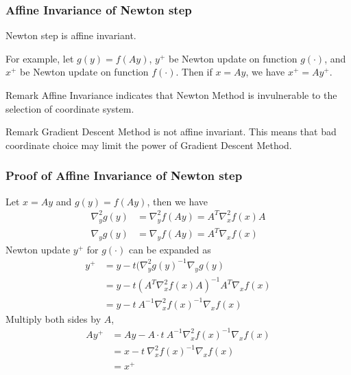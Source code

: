 \documentclass{beamer}
\begin{document}
\begin{frame}
\frametitle{Affine Invariance of Newton step}
\begin{lemma}
    Newton step is affine invariant. 
\end{lemma}
For example, let $g(y) = f(Ay)$, $y^{+}$ be Newton update on function
$g(\cdot)$, and 
$x^{+}$ be Newton update on function $f(\cdot)$. 
Then if $x=Ay$, we have $x^{+} = Ay^{+}$.
\begin{block}{Remark}
    Affine Invariance indicates that Newton Method is invulnerable to the
    selection of coordinate system. 
\end{block}
\begin{block}{Remark}
    Gradient Descent Method is not affine invariant. This means
    that bad coordinate choice may limit the power of Gradient Descent Method.
\end{block}
\end{frame}
\begin{frame}
\frametitle{Proof of Affine Invariance of Newton step}
    Let $x = Ay$ and $g(y) = f(Ay)$, then we have
    \begin{align}
       \nabla^2_{y}g(y) &= \nabla^2_{y}f(Ay) = A^T \nabla^2_{x}f(x) A \\
       \nabla_{y}g(y)   &= \nabla_{y}f(Ay) = A^T \nabla_{x}f(x)
    \end{align}
    Newton update $y^{+}$ for $g(\cdot)$ can be expanded as
    \begin{align}
        y^{+} &= y - t(\nabla^2_{y}g(y)^{-1} \nabla_{y}g(y)      \nonumber \\
        &= y - t(A^T \nabla^2_{x}f(x) A)^{-1} A^T \nabla_{x}f(x) \nonumber \\
        &= y - t\ A^{-1} \nabla^2_{x}f(x)^{-1} \nabla_{x}f(x)
    \end{align}
    Multiply both sides by $A$, 
    \begin{align}
        Ay^{+} &= Ay - A \cdot t\ A^{-1} \nabla^2_{x}f(x)^{-1} \nabla_{x}f(x)  \nonumber \\
        &= x - t\ \nabla^2_{x}f(x)^{-1} \nabla_{x}f(x) \nonumber \\
        &= x^{+}
    \end{align}
\end{frame}
\end{document}
